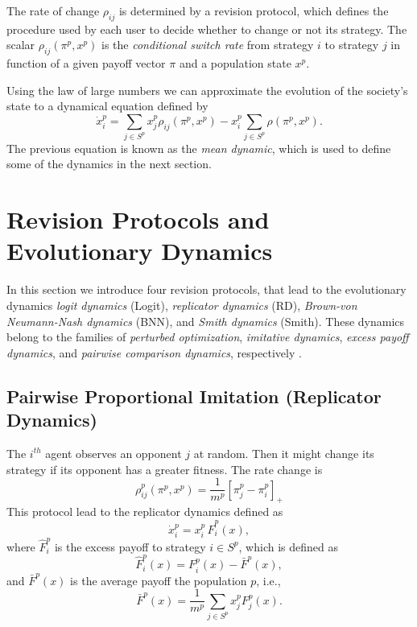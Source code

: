 \documentclass[a4paper,10pt]{article}
\def\th{^{th}}
\def\th{^{th}}
\begin{document}
 The rate of change $\rho_{ij}$ is determined by a revision protocol, which defines the procedure used by each user to decide whether to change or not its strategy. The scalar $\rho_{ij} (\pi^p, x^p)$ is the \emph{conditional switch rate} from strategy $i$ to strategy $j$ in function of a given payoff vector $\pi$ and a population state $x^p$.
 
 Using the law of large numbers we can approximate the evolution of the society's state to a dynamical equation defined by
 \begin{equation}\label{eq:mean_dynamic}
  \dot{x}_i^p = \sum_{j\in S^p} x_j^p \rho_{ij} (\pi^p, x^p) - x_i^p \sum_{j\in S^p} \rho(\pi^p, x^p).
 \end{equation}
The previous equation is known as the \emph{mean dynamic}, which is used to define  some of the dynamics in the next section.

 
 
 \section{Revision Protocols and Evolutionary Dynamics}\label{sec:protocols}
 
 
In this section we introduce four revision protocols, that lead to the evolutionary dynamics \emph{logit dynamics} (Logit), \emph{replicator dynamics} (RD), \emph{Brown-von Neumann-Nash dynamics} (BNN), and \emph{Smith dynamics} (Smith). These dynamics belong to the families of \emph{perturbed optimization}, \emph{imitative dynamics}, \emph{excess payoff dynamics}, and \emph{pairwise comparison dynamics}, respectively \cite{hofbauer2001nash, sandholm_book}. 
 
 
 
 
 \subsection{Pairwise Proportional Imitation (Replicator Dynamics)}

The $i\th$ agent observes an opponent $j$ at random. Then it might change its strategy if  its opponent has a greater fitness. The rate change is 
%
\begin{equation}
\rho_{ij}^p(\pi^p, x^p) = \frac{1}{m^p} [\pi_j^p - \pi_i^p]_+
\end{equation}
This protocol lead to the replicator dynamics defined as
\begin{equation}\label{eq:replicator}
\dot{x}_i^p = x_i^p \, \hat{F}_i^p \left( x \right),
\end{equation}
where $\hat{F}_i^p$ is the excess payoff to strategy $i\in S^p$, which is defined as   
\begin{equation}
\hat{F}_i^p (x) =  F_i^p(x) - \bar{F}^p(x),
\end{equation}
and $\bar{F}^p(x)$ is the average payoff the population $p$, i.e., 
\begin{equation}
 \bar{F}^p(x) = \frac{1}{m^p} \sum_{j \in S^p} x_j^p F_j^p(x).
\end{equation}
\end{document}
